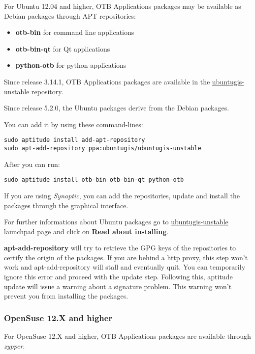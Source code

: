 For Ubuntu 12.04 and higher, OTB Applications packages may be available as
Debian packages through APT repositories:
\begin{itemize}
\item \textbf{otb-bin} for command line applications
\item \textbf{otb-bin-qt} for Qt applications
\item \textbf{python-otb} for python applications
\end{itemize}

Since release 3.14.1, OTB Applications packages are available in the
\href{https://launchpad.net/~ubuntugis/+archive/ubuntugis-unstable}{ubuntugis-unstable} repository.

Since release 5.2.0, the Ubuntu packages derive from the Debian packages.

You can add it by using these command-lines:
\begin{verbatim}
sudo aptitude install add-apt-repository
sudo apt-add-repository ppa:ubuntugis/ubuntugis-unstable
\end{verbatim}

After you can run:
\begin{verbatim}
sudo aptitude install otb-bin otb-bin-qt python-otb
\end{verbatim}

If you are using \emph{Synaptic}, you can add the repositories, update and install the packages through the
graphical interface.

For further informations about Ubuntu packages go to
\href{https://launchpad.net/~ubuntugis/+archive/ubuntugis-unstable}{ubuntugis-unstable}
launchpad page and click on \textbf{Read about installing}.

\textbf{apt-add-repository} will try to retrieve the GPG keys of the
repositories to certify the origin of the packages. If you are behind a http
proxy, this step won't work and apt-add-repository will stall and eventually
quit. You can temporarily ignore this error and proceed with the update
step. Following this, aptitude update will issue a warning about a signature
problem. This warning won't prevent you from installing the packages.

\subsubsection{OpenSuse 12.X and higher}

For OpenSuse 12.X and higher, OTB Applications packages are available through
\emph{zypper}.


